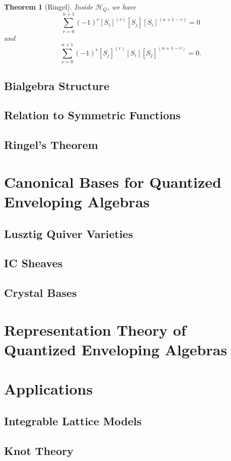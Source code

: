 \documentclass{book}
\newtheorem{theorem}{Theorem}[section]
\begin{document}
    \begin{theorem}[Ringel]
        Inside $\mathcal{H}_Q$, we have \[\sum_{r=0}^{n+1}(-1)^r[S_i]^{(r)}[S_j][S_i]^{(n+1-r)}=0\] and \[\sum_{r=0}^{n+1}(-1)^r[S_j]^{(r)}[S_i][S_j]^{(n+1-r)}=0.\]
    \end{theorem}
    
    

  \section{Bialgebra Structure}

  \section{Relation to Symmetric Functions}

  \section{Ringel's Theorem}


\chapter{Canonical Bases for Quantized Enveloping Algebras}

  \section{Lusztig Quiver Varieties}

  \section{IC Sheaves}

  \section{Crystal Bases}


\chapter{Representation Theory of Quantized Enveloping Algebras}


\chapter{Applications}

  \section{Integrable Lattice Models}

  \section{Knot Theory}
\end{document}
